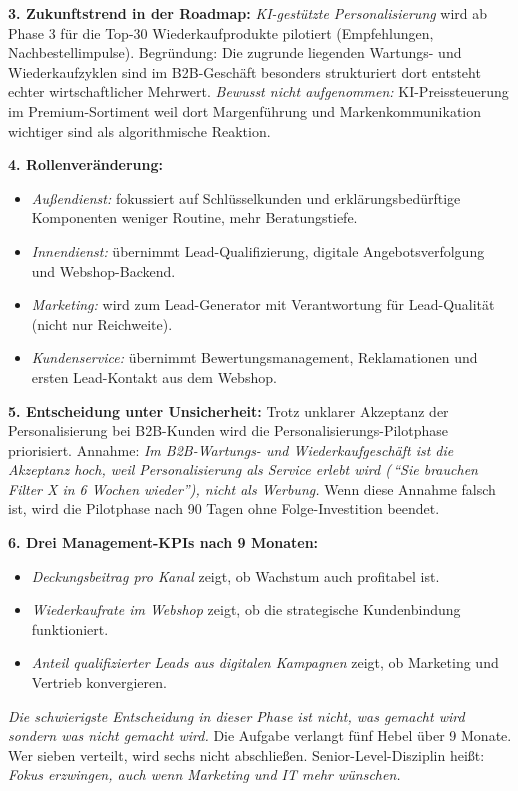 \documentclass[11pt,a4paper,oneside]{article}
\begin{document}
\begin{loesungbox}
\textbf{3. Zukunftstrend in der Roadmap:}
\emph{KI-gestützte Personalisierung} wird ab Phase 3 für die Top-30 Wiederkaufprodukte pilotiert (Empfehlungen, Nachbestellimpulse). Begründung: Die zugrunde liegenden Wartungs- und Wiederkaufzyklen sind im B2B-Geschäft besonders strukturiert \textendash{} dort entsteht echter wirtschaftlicher Mehrwert. \emph{Bewusst nicht aufgenommen:} KI-Preissteuerung im Premium-Sortiment \textendash{} weil dort Margenführung und Markenkommunikation wichtiger sind als algorithmische Reaktion.

\textbf{4. Rollenveränderung:}
\begin{itemize}
  \item \emph{Außendienst:} fokussiert auf Schlüsselkunden und erklärungsbedürftige Komponenten \textendash{} weniger Routine, mehr Beratungstiefe.
  \item \emph{Innendienst:} übernimmt Lead-Qualifizierung, digitale Angebotsverfolgung und Webshop-Backend.
  \item \emph{Marketing:} wird zum Lead-Generator mit Verantwortung für Lead-Qualität (nicht nur Reichweite).
  \item \emph{Kundenservice:} übernimmt Bewertungsmanagement, Reklamationen und ersten Lead-Kontakt aus dem Webshop.
\end{itemize}

\textbf{5. Entscheidung unter Unsicherheit:}
Trotz unklarer Akzeptanz der Personalisierung bei B2B-Kunden wird die Personalisierungs-Pilotphase priorisiert. Annahme: \emph{Im B2B-Wartungs- und Wiederkaufgeschäft ist die Akzeptanz hoch, weil Personalisierung als Service erlebt wird (\,``Sie brauchen Filter X in 6 Wochen wieder''), nicht als Werbung.} Wenn diese Annahme falsch ist, wird die Pilotphase nach 90 Tagen ohne Folge-Investition beendet.

\textbf{6. Drei Management-KPIs nach 9 Monaten:}
\begin{itemize}
  \item \emph{Deckungsbeitrag pro Kanal} \textendash{} zeigt, ob Wachstum auch profitabel ist.
  \item \emph{Wiederkaufrate im Webshop} \textendash{} zeigt, ob die strategische Kundenbindung funktioniert.
  \item \emph{Anteil qualifizierter Leads aus digitalen Kampagnen} \textendash{} zeigt, ob Marketing und Vertrieb konvergieren.
\end{itemize}

\begin{merkbox}[Managementhinweis]
\emph{Die schwierigste Entscheidung in dieser Phase ist nicht, was gemacht wird \textendash{} sondern was nicht gemacht wird.} Die Aufgabe verlangt fünf Hebel über 9 Monate. Wer sieben verteilt, wird sechs nicht abschließen. Senior-Level-Disziplin heißt: \emph{Fokus erzwingen, auch wenn Marketing und IT mehr wünschen.}
\end{merkbox}
\end{loesungbox}
\end{document}
